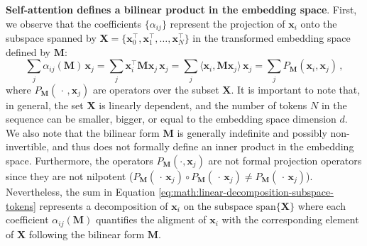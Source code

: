 \textbf{Self-attention defines a bilinear product in the embedding space}. First, we observe that the coefficients $\{\alpha_{ij}\}$ represent the projection of $\bm{x}_i$ onto the subspace spanned by $\bm{X} = \{\bm{x}_0^\top, \bm{x}_1^\top, \dots, \bm{x}_N^\top\}$ in the transformed embedding space defined by $\bm{M}$:
%
\begin{equation}
\label{eq:math:linear-decomposition-subspace-tokens}
     \sum_j \alpha_{ij}(\bm{M})\, \bm{x}_j = \sum_j \bm{x}_i^\top \bm{M} \bm{x}_j\,\bm{x}_j = \sum_j \langle \bm{x}_i, \bm{M}\bm{x}_j \rangle \,\bm{x}_j = \sum_j P_{\bm{M}}(\bm{x}_i ,\bm{x}_j)\,,
\end{equation}
%
where $P_{\bm{M}}(\,\cdot\,, \bm{x}_j)$ are operators over the subset $\bm{X}$.
%
It is important to note that, in general, the set $\bm{X}$ is linearly dependent, and the number of tokens $N$ in the sequence can be smaller, bigger, or equal to the embedding space dimension $d$.
%
We also note that the bilinear form $\bm{M}$ is generally indefinite and possibly non-invertible, and thus does not formally define an inner product in the embedding space. 
%
Furthermore, the operators $P_{\bm{M}}(\cdot, \bm{x}_j)$ are not formal projection operators since they are not nilpotent ($P_{\bm{M}}(\,\cdot\, \bm{x}_j) \circ P_{\bm{M}}(\,\cdot\, \bm{x}_j) \neq P_{\bm{M}}(\,\cdot\, \bm{x}_j)$).
%
Nevertheless, the sum in Equation \ref{eq:math:linear-decomposition-subspace-tokens} represents a decomposition of $\bm{x}_i$ on the subspace $\text{span}\{\bm{X}\}$ where each coefficient $\alpha_{ij}(\bm{M})$ quantifies the aligment of $\bm{x}_i$ with the corresponding element of $\bm{X}$ following the bilinear form $\bm{M}$. 
%


